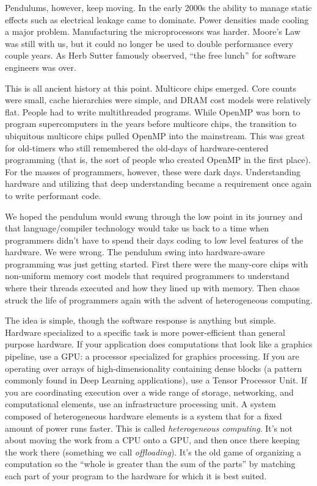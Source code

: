 Pendulums, however, keep moving.  In the early 2000s the ability to manage static effects such as electrical
leakage came to dominate.   Power densities made cooling a major problem.  Manufacturing the microprocessors was harder. Moore's Law was 
still with us, but it could no longer be used to double performance every couple years.
As Herb Sutter famously observed, ``the free lunch'' for software engineers was over. 

This is all ancient history at this point.  Multicore chips emerged.  Core counts were small, cache hierarchies were 
simple, and DRAM cost models were relatively flat.   People had to write multithreaded programs.   While OpenMP
was born to program supercomputers in the years before multicore chips,
the transition to ubiquitous multicore chips pulled OpenMP into the mainstream.  This was great for 
old-timers who still remembered the old-days of hardware-centered programming (that is, the sort of people 
who created OpenMP in the first place). For the masses of programmers, however, these were dark days.
Understanding hardware and utilizing that deep understanding became a requirement once again to write performant code.

We hoped the pendulum would swung through the low point in its journey and that language/compiler technology
would take us back to a time when programmers didn't have to spend their days coding to low level features of the
hardware.  We were wrong.  The pendulum swing into hardware-aware programming was just getting started.
First there were the many-core chips with non-uniform memory cost models that required programmers to understand
where their threads executed and how they lined up with memory.  Then chaos struck the life of programmers again with
the advent of heterogeneous computing.

The idea is simple, though the software response is anything but simple.  Hardware specialized to a specific task is
more power-efficient than general purpose hardware.   If your application does computations that look like a graphics pipeline, 
use a GPU: a processor specialized for graphics processing.  If you are operating over arrays of high-dimensionality containing dense blocks
(a pattern commonly found in Deep Learning applications), use a Tensor Processor Unit.  If
you are coordinating execution over a wide range of storage, networking, and computational elements, use an infrastructure
processing unit. A system composed of heterogeneous hardware elements is a system that for a fixed amount of power runs faster.
This is called \emph{heterogeneous computing}.   It's not about moving the work from a CPU onto a GPU, and then once there 
keeping the work there (something we call \emph{offloading}).   It's the old game of organizing a computation 
so the ``whole is greater than the sum of the parts'' by matching each part of your program to the hardware for which it is best suited.

